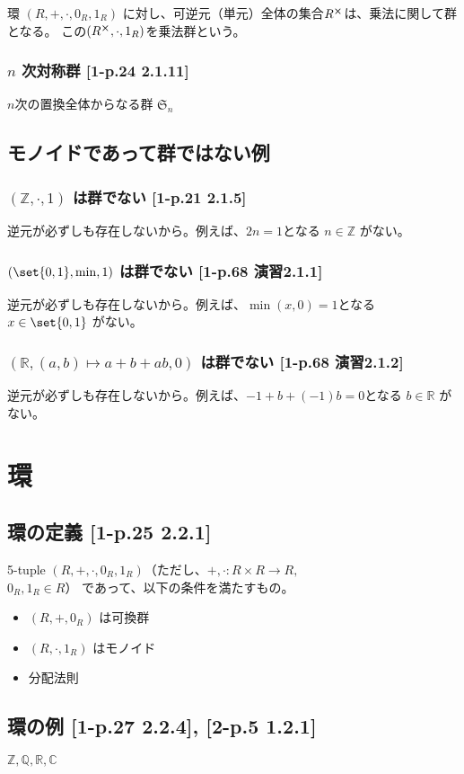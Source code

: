 \documentclass[twocolumn]{jsarticle}
\newcommand{\Z}{\mathbb{Z}}
\newcommand{\R}{\mathbb{R}}
\newcommand{\C}{\mathbb{C}}
\begin{document}
環 \((R, +, \cdot, 0_R, 1_R)\) に対し、可逆元（単元）全体の集合\(R^{\cross}\)は、乗法に関して群となる。
この\((R^{\cross}, \cdot, 1_R)\)を乗法群という。

\subsubsection{\(n\) 次対称群 [1-p.24 2.1.11]}
\(n\)次の置換全体からなる群 \(\mathfrak{S}_n\)

\subsection{モノイドであって群ではない例}
\subsubsection{\((\Z, \cdot, 1)\) は群でない [1-p.21 2.1.5]}
逆元が必ずしも存在しないから。例えば、\(2n=1\)となる \(n\in\Z\) がない。
\subsubsection{\((\set{0, 1}, \min, 1)\) は群でない [1-p.68 演習2.1.1]}
逆元が必ずしも存在しないから。例えば、\(\min(x,0)=1\)となる \(x\in\set{0, 1}\) がない。
\subsubsection{\((\R, (a,b) \mapsto a+b+ab, 0)\) は群でない [1-p.68 演習2.1.2]}
逆元が必ずしも存在しないから。例えば、\(-1+b+(-1)b=0\)となる \(b\in\R\) がない。

\section{環}
\subsection{環の定義 [1-p.25 2.2.1]}
5-tuple \((R, +, \cdot, 0_R, 1_R)\)（ただし、\({+},{\cdot}\colon R \times R \to R,\)\\ \(0_R, 1_R \in R\)） であって、以下の条件を満たすもの。
\begin{itemize}
    \item \((R, +, 0_R)\) は可換群
    \item \((R, \cdot, 1_R)\) はモノイド
    \item 分配法則
\end{itemize}
\subsection{環の例 [1-p.27 2.2.4], [2-p.5 1.2.1]}
\(\Z, \mathbb{Q}, \R, \C\)
\end{document}
